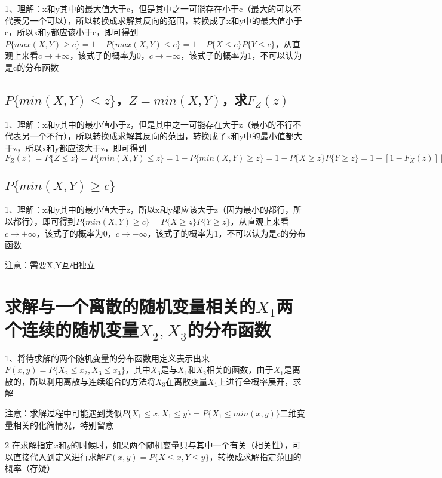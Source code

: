 1、理解：x和y其中的最大值大于c，但是其中之一可能存在小于c（最大的可以不代表另一个可以），所以转换成求解其反向的范围，转换成了x和y中的最大值小于c，所以x和y都应该小于c，即可得到$P\{max(X,Y)\ge c\}=1-P\{max(X,Y)\le c\}=1-P\{X \le c\}P\{Y \le c\}$，从直观上来看$c \rightarrow +\infty$，该式子的概率为0，$c \rightarrow -\infty$，该式子的概率为1，不可以认为是c的分布函数



\subsection{$P\{min(X,Y)\le z\}$，$Z=min(X,Y)$，求$F_Z(z)$}

1、理解：x和y其中的最小值小于z，但是其中之一可能存在大于z（最小的不行不代表另一个不行），所以转换成求解其反向的范围，转换成了x和y中的最小值都大于z，所以x和y都应该大于z，即可得到$F_{Z}(z)=P\{Z\le z\}=P\{min(X,Y)\le z\}=1-P\{min(X,Y)\ge z\}=1-P\{X \ge z\}P\{Y \ge z\}=1-[1-F_X(z)][1-F_Y(z)]$



\subsection{$P\{min(X,Y)\ge c\}$}

1、理解：x和y其中的最小值大于z，所以x和y都应该大于z（因为最小的都行，所以都行），即可得到$P\{min(X,Y)\ge c\}=P\{X \ge z\}P\{Y \ge z\}$，从直观上来看$c \rightarrow +\infty$，该式子的概率为0，$c \rightarrow -\infty$，该式子的概率为1，不可以认为是c的分布函数

注意：需要X,Y互相独立

\section{求解与一个离散的随机变量相关的$X_1$两个连续的随机变量$X_2,X_3$的分布函数}

1、将待求解的两个随机变量的分布函数用定义表示出来$F(x,y)=P\{ X_2 \le x_2, X_3 \le x_3 \}$，其中$X_3$是与$X_1$和$X_2$相关的函数，由于$X_1$是离散的，所以利用离散与连续组合的方法将$X_3$在离散变量$X_1$上进行全概率展开，求解

注意：求解过程中可能遇到类似$P\{ X_1\le x,X_1\le y \} = P\{ X_1 \le min(x,y) \}$二维变量相关的化简情况，特别留意



2 在求解指定$x$和$y$的时候时，如果两个随机变量只与其中一个有关（相关性），可以直接代入到定义进行求解$F(x,y)=P\{ X \le x, Y \le y \}$，转换成求解指定范围的概率（存疑）

